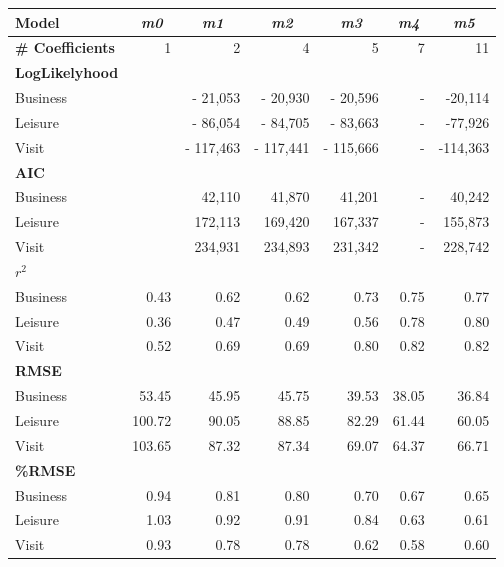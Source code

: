 \begin{tabular}{lrrrrrr}
\toprule
\textbf{Model} & \multicolumn{1}{c}{\textit{\textbf{m0}}} & \multicolumn{1}{c}{\textit{\textbf{m1}}} & \multicolumn{1}{c}{\textit{\textbf{m2}}} & \multicolumn{1}{c}{\textit{\textbf{m3}}} & \multicolumn{1}{c}{\textit{\textbf{m4}}} & \multicolumn{1}{c}{\textit{\textbf{m5}}} \\
\midrule
\textbf{\# Coefficients} & 1     & 2     & 4     & 5     &   7    & 11 \\
\midrule
\textbf{LogLikelyhood} &       &       &       &       &       &  \\
Business &       & -   21,053 & -   20,930  & -   20,596  & - & -20,114     \\
Leisure &       & -   86,054  & -   84,705  & -   83,663  & - & -77,926     \\
Visit &       & - 117,463  & - 117,441  & - 115,666  & -  & -114,363    \\
\midrule
\textbf{AIC} &       &       &       &       &       &  \\
Business &       &      42,110  &      41,870  &  41,201 & - & 40,242     \\
Leisure &       &    172,113  &    169,420  &    167,337  & - & 155,873    \\
Visit &       &    234,931  &    234,893  &    231,342  & - & 228,742    \\
\midrule
\boldmath{}\textbf{$r^2$}\unboldmath{} &       &       &       &       &       &  \\
Business & 0.43  & 0.62  & 0.62  & 0.73  &   0.75    & 0.77 \\
Leisure & 0.36  & 0.47  & 0.49  & 0.56  &   0.78    & 0.80 \\
Visit & 0.52  & 0.69  & 0.69  & 0.80  &   0.82    &  0.82 \\
\midrule
\textbf{RMSE} &       &       &       &       &       &  \\
Business & 53.45 & 45.95 & 45.75 & 39.53 &   38.05    &  36.84 \\
Leisure & 100.72 & 90.05 & 88.85 & 82.29 &  61.44     &  60.05 \\
Visit & 103.65 & 87.32 & 87.34 & 69.07 &   64.37    & 66.71 \\
\midrule
\textbf{\%RMSE} &       &       &       &       &       &  \\
Business & 0.94 & 0.81 & 0.80 & 0.70 &   0.67    & 0.65 \\
Leisure & 1.03 & 0.92 & 0.91 & 0.84 &  0.63     & 0.61  \\
Visit & 0.93 & 0.78 & 0.78 & 0.62 &    0.58   &  0.60 \\
\bottomrule
\end{tabular}%
